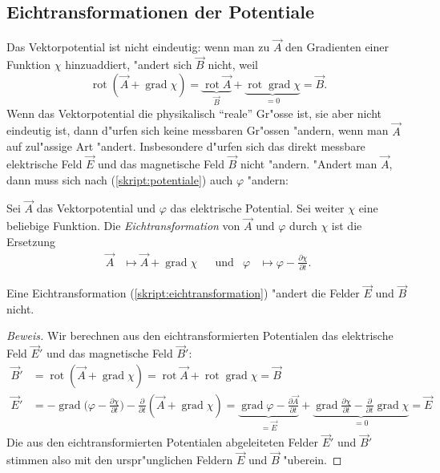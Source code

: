 \subsection{Eichtransformationen der Potentiale}
Das Vektorpotential ist nicht eindeutig: wenn man zu $\vec A$
den Gradienten einer Funktion $\chi$ hinzuaddiert, "andert sich
$\vec B$ nicht, weil
\[
\operatorname{rot}(\vec A+\operatorname{grad}\chi)
=
\underbrace{\operatorname{rot}\vec A}_{\vec B}
+
\underbrace{\operatorname{rot}\operatorname{grad}\chi}_{=0}
=
\vec B.
\]
Wenn das Vektorpotential die physikalisch ``reale'' Gr"osse ist,
sie aber nicht eindeutig ist, dann d"urfen sich keine messbaren
Gr"ossen "andern, wenn man $\vec A$ auf zul"assige Art "andert.
Insbesondere d"urfen sich das direkt messbare elektrische Feld
$\vec E$ und das magnetische Feld $\vec B$ nicht "andern.
"Andert man $\vec A$, dann muss sich nach (\ref{skript:potentiale})
auch $\varphi$ "andern:

\begin{definition}
Sei $\vec A$ das Vektorpotential und $\varphi$ das elektrische
Potential. Sei weiter $\chi$ eine beliebige Funktion.
Die {\em Eichtransformation} von $\vec A$ und $\varphi$ durch $\chi$ ist
die Ersetzung
\begin{equation}
\begin{aligned}
\vec A&\mapsto \vec A + \operatorname{grad}\chi
&&\text{und}&
\varphi&\mapsto \varphi-\frac{\partial\chi}{\partial t}.
\end{aligned}
\label{skript:eichtransformation}
\end{equation}
\end{definition}

\begin{satz}
Eine Eichtransformation (\ref{skript:eichtransformation}) "andert die
Felder $\vec E$ und $\vec B$ nicht.
\end{satz}

\begin{proof}[Beweis]
Wir berechnen aus den eichtransformierten Potentialen das elektrische Feld
$\vec E'$ und das magnetische Feld $\vec B'$:
\begin{align*}
\vec B'
&=
\operatorname{rot}(\vec A+\operatorname{grad}\chi)
=
\operatorname{rot}\vec A+\operatorname{rot}\operatorname{grad}\chi
=
\vec B
\\
\vec E'
&=
-\operatorname{grad}\biggl(\varphi -\frac{\partial\chi}{\partial t}\biggr)
-\frac{\partial}{\partial t}(\vec A+\operatorname{grad}\chi)
=
\underbrace{
\operatorname{grad}\varphi-\frac{\partial\vec A}{\partial t}
}_{=\vec E}
+
\underbrace{
\operatorname{grad}\frac{\partial\chi}{\partial t}
-\frac{\partial}{\partial t}\operatorname{grad}\chi
}_{=0}
=
\vec E
\end{align*}
Die aus den eichtransformierten Potentialen abgeleiteten Felder $\vec E'$
und $\vec B'$ stimmen also mit den urspr"unglichen Feldern $\vec E$
und $\vec B$ "uberein.
\end{proof}

